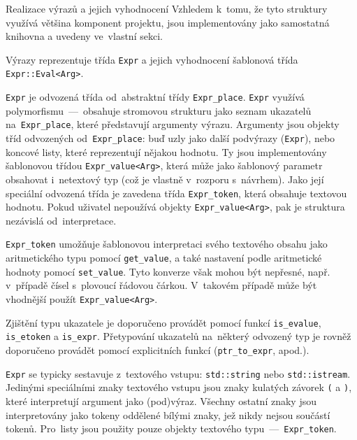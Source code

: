 \documentclass[thesis=M,czech]{FITthesis}[2012/06/26]
\newcommand{\id}[1]{\texttt{#1}}
\begin{document}

\begin{section}{Realizace výrazů a jejich vyhodnocení}
\label{s:impl:exprs}
Vzhledem k~tomu, že tyto struktury využívá většina komponent projektu,
jsou implementovány jako samostatná knihovna
a uvedeny ve~vlastní sekci.

Výrazy reprezentuje třída \id{Expr}
a jejich vyhodnocení šablonová třída \id{Expr::\-Eval<Arg>}.


\begin{paragraph}{\id{Expr}}\label{p:impl:exprs:expr}
je odvozená třída od~abstraktní třídy \id{Expr\_\-place}.
\id{Expr} využívá polymorfismu~---~obsahuje
stromovou strukturu jako seznam ukazatelů na~\id{Expr\_\-place},
které představují argumenty výrazu.
Argumenty jsou objekty tříd odvozených od~\id{Expr\_\-place}:
buď uzly jako další podvýrazy (\id{Expr}),
nebo koncové listy, které reprezentují nějakou hodnotu.
Ty jsou implementovány šablonovou třídou \id{Expr\_\-value<Arg>},
která může jako šablonový parametr obsahovat i~netextový typ
(což je vlastně v~rozporu s~návrhem).
Jako její speciální odvozená třída je zavedena
třída \id{Expr\_\-token}, která obsahuje textovou hodnotu.
Pokud uživatel nepoužívá objekty
\id{Expr\_\-value<Arg>},
pak je struktura nezávislá od~interpretace.

\id{Expr\_\-token} umožňuje šablonovou
interpretaci svého textového obsahu
jako aritmetického typu pomocí \id{get\_\-value},
a také nastavení podle aritmetické hodnoty pomocí \id{set\_\-value}.
Tyto konverze však mohou být nepřesné,
např. v~případě čísel s~plovoucí řádovou čárkou.
V~takovém případě může být vhodnější použít \id{Expr\_\-value<Arg>}.

Zjištění typu ukazatele je doporučeno provádět pomocí funkcí
\id{is\_\-evalue}, \id{is\_\-etoken} a \id{is\_\-expr}.
Přetypování ukazatelů na~některý odvozený typ
je rovněž doporučeno provádět pomocí explicitních funkcí
(\id{ptr\_\-to\_\-expr}, apod.).

\id{Expr} se typicky sestavuje z~textového vstupu:
\id{std::\-string} nebo \id{std::\-istream}.
Jedinými speciálními znaky textového vstupu
jsou znaky kulatých závorek \id{(} a \id{)},
které interpretují argument jako (pod)výraz.
Všechny ostatní znaky jsou interpretovány jako tokeny
oddělené bílými znaky, jež nikdy nejsou součástí tokenů.
Pro~listy jsou použity pouze objekty
textového typu~---~\id{Expr\_\-token}.


\end{paragraph}
\end{section}
\end{document}
